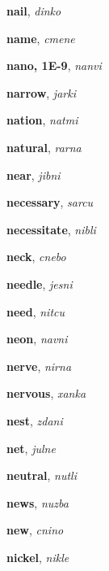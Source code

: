 \documentclass[12pt]{book}
\begin{document}
\begin{description}

\item[ ] \textbf{nail}, \textit{dinko}

\item[ ] \textbf{name}, \textit{cmene}

\item[ ] \textbf{nano, 1E-9}, \textit{nanvi}

\item[ ] \textbf{narrow}, \textit{jarki}

\item[ ] \textbf{nation}, \textit{natmi}

\item[ ] \textbf{natural}, \textit{rarna}

\item[ ] \textbf{near}, \textit{jibni}

\item[ ] \textbf{necessary}, \textit{sarcu}

\item[ ] \textbf{necessitate}, \textit{nibli}

\item[ ] \textbf{neck}, \textit{cnebo}

\item[ ] \textbf{needle}, \textit{jesni}

\item[ ] \textbf{need}, \textit{nitcu}

\item[ ] \textbf{neon}, \textit{navni}

\item[ ] \textbf{nerve}, \textit{nirna}

\item[ ] \textbf{nervous}, \textit{xanka}

\item[ ] \textbf{nest}, \textit{zdani}

\item[ ] \textbf{net}, \textit{julne}

\item[ ] \textbf{neutral}, \textit{nutli}

\item[ ] \textbf{news}, \textit{nuzba}

\item[ ] \textbf{new}, \textit{cnino}

\item[ ] \textbf{nickel}, \textit{nikle}


\end{description}
\end{document}
